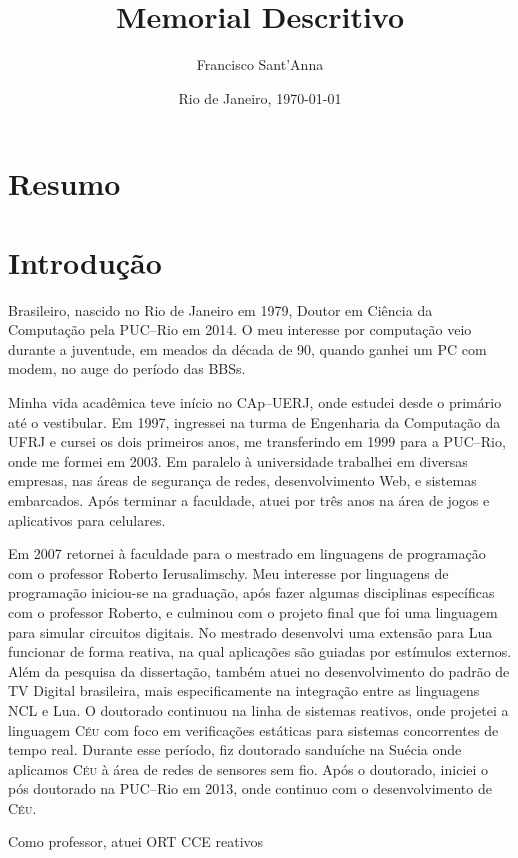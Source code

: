 \documentclass[12pt,a4paper]{article}
\title{Memorial Descritivo}
\author{Francisco Sant'Anna}
\date{Rio de Janeiro, \today}
\newcommand{\CEU}{\textsc{C\'{e}u}\xspace}
\begin{document}
\maketitle

\section{Resumo}

\section{Introdução}

Brasileiro, nascido no Rio de Janeiro em 1979, Doutor em Ciência da Computação 
pela PUC--Rio em 2014.
%
O meu interesse por computação veio durante a juventude, em meados da década de 
90, quando ganhei um PC com modem, no auge do período das BBSs.

Minha vida acadêmica teve início no CAp--UERJ, onde estudei desde o primário 
até o vestibular.
%
Em 1997, ingressei na turma de Engenharia da Computação da UFRJ e cursei os 
dois primeiros anos, me transferindo em 1999 para a PUC--Rio, onde me formei em 
2003.
%
Em paralelo à universidade trabalhei em diversas empresas, nas áreas de 
segurança de redes, desenvolvimento Web, e sistemas embarcados.
%
Após terminar a faculdade, atuei por três anos na área de jogos e aplicativos 
para celulares.

Em 2007 retornei à faculdade para o mestrado em linguagens de programação com o 
professor Roberto Ierusalimschy.
%
Meu interesse por linguagens de programação iniciou-se na graduação, após fazer 
algumas disciplinas específicas com o professor Roberto, e culminou com o 
projeto final que foi uma linguagem para simular circuitos digitais.
%
No mestrado desenvolvi uma extensão para Lua funcionar de forma reativa, na 
qual aplicações são guiadas por estímulos externos.
%
Além da pesquisa da dissertação, também atuei no desenvolvimento do padrão de 
TV Digital brasileira, mais especificamente na integração entre as linguagens 
NCL e Lua.
%
O doutorado continuou na linha de sistemas reativos, onde projetei a linguagem 
\CEU com foco em verificações estáticas para sistemas concorrentes de tempo 
real.
Durante esse período, fiz doutorado sanduíche na Suécia onde aplicamos \CEU à 
área de redes de sensores sem fio.
%
Após o doutorado, iniciei o pós doutorado na PUC--Rio em 2013, onde continuo 
com o desenvolvimento de \CEU.

Como professor, atuei
ORT
CCE
reativos
\end{document}
